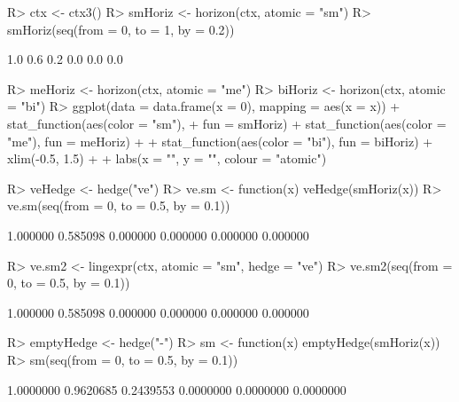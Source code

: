 \documentclass{article}\usepackage[]{graphicx}\usepackage[]{color}
\begin{document}
\begin{Schunk}
% --begin: "horizon"
\begin{Sinput}
R> ctx <- ctx3()
R> smHoriz <- horizon(ctx, atomic = "sm")
R> smHoriz(seq(from = 0, to = 1, by = 0.2))
\end{Sinput}
\begin{Soutput}
[1] 1.0 0.6 0.2 0.0 0.0 0.0
\end{Soutput}
%
% --end: "horizon"
\end{Schunk}

\begin{Schunk}
\begin{Sinput}
R> meHoriz <- horizon(ctx, atomic = "me")
R> biHoriz <- horizon(ctx, atomic = "bi")
R> ggplot(data = data.frame(x = 0), mapping = aes(x = x)) + stat_function(aes(color = "sm"), 
+      fun = smHoriz) + stat_function(aes(color = "me"), fun = meHoriz) + 
+      stat_function(aes(color = "bi"), fun = biHoriz) + xlim(-0.5, 1.5) + 
+      labs(x = "", y = "", colour = "atomic\nexpression")
\end{Sinput}
\end{Schunk}

\begin{Schunk}
% --begin: "hedge"
\begin{Sinput}
R> veHedge <- hedge("ve")
R> ve.sm <- function(x) veHedge(smHoriz(x))
R> ve.sm(seq(from = 0, to = 0.5, by = 0.1))
\end{Sinput}
\begin{Soutput}
[1] 1.000000 0.585098 0.000000 0.000000 0.000000 0.000000
\end{Soutput}
%
% --end: "hedge"
\end{Schunk}


\begin{Schunk}
% --begin: "lingexpr"
\begin{Sinput}
R> ve.sm2 <- lingexpr(ctx, atomic = "sm", hedge = "ve")
R> ve.sm2(seq(from = 0, to = 0.5, by = 0.1))
\end{Sinput}
\begin{Soutput}
[1] 1.000000 0.585098 0.000000 0.000000 0.000000 0.000000
\end{Soutput}
%
% --end: "lingexpr"
\end{Schunk}

\begin{Schunk}
% --begin: "emptyhedge1"
\begin{Sinput}
R> emptyHedge <- hedge("-")
R> sm <- function(x) emptyHedge(smHoriz(x))
R> sm(seq(from = 0, to = 0.5, by = 0.1))
\end{Sinput}
\begin{Soutput}
[1] 1.0000000 0.9620685 0.2439553 0.0000000 0.0000000 0.0000000
\end{Soutput}
%
% --end: "emptyhedge1"
\end{Schunk}
\end{document}
